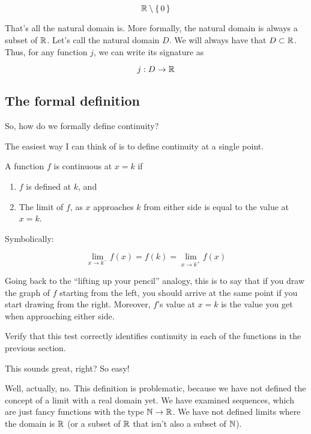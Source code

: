 \begin{equation}
  \mathbb{R} \setminus \left\{\, 0 \,\right\}
\end{equation}

That's all the natural domain is. More formally, the natural domain is always a
subset of $\mathbb{R}$. Let's call the natural domain $D$. We will always have that
$D \subset \mathbb{R}$. Thus, for any function $j$, we can write its signature as

\begin{equation}
  j : D \to \mathbb{R}
\end{equation}

\subsection{The formal definition}

So, how do we formally define continuity?

The easiest way I can think of is to define continuity at a single point.

A function $f$ is continuous at $x = k$ if

\begin{enumerate}
\item $f$ is defined at $k$, and
\item The limit of $f$, as $x$ approaches $k$ from either side is equal to the
  value at $x = k$.
\end{enumerate}

Symbolically:

\begin{equation}
  \lim_{x \to k^-} f(x) =
  f(k) =
  \lim_{x \to k^+} f(x)
\end{equation}

Going back to the ``lifting up your pencil'' analogy, this is to say that if you
draw the graph of $f$ starting from the left, you should arrive at the same
point if you start drawing from the right. Moreover, $f$'s value at $x = k$ is
the value you get when approaching either side.

\begin{exercise}
  Verify that this test correctly identifies continuity in each of the functions
  in the previous section.
\end{exercise}

This sounds great, right? So easy!

Well, actually, no. This definition is problematic, because we have not defined
the concept of a limit with a real domain yet. We have examined sequences, which
are just fancy functions with the type $\mathbb{N} \to \mathbb{R}$. We have not defined limits
where the domain is $\mathbb{R}$ (or a subset of $\mathbb{R}$ that isn't also a subset of $\mathbb{N}$).

